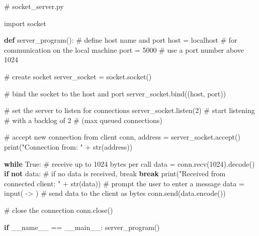 \documentclass[
  nswissgerman,
  a4paper,
  DIV=11,
  numbers=noendperiod,
  ngerman]{scrreprt}
\newenvironment{Shaded}{\begin{snugshade}}{\end{snugshade}}
\newcommand{\BuiltInTok}[1]{\textcolor[rgb]{0.00,0.23,0.31}{#1}}
\newcommand{\CommentTok}[1]{\textcolor[rgb]{0.37,0.37,0.37}{#1}}
\newcommand{\ControlFlowTok}[1]{\textcolor[rgb]{0.00,0.23,0.31}{\textbf{#1}}}
\newcommand{\DecValTok}[1]{\textcolor[rgb]{0.68,0.00,0.00}{#1}}
\newcommand{\ImportTok}[1]{\textcolor[rgb]{0.00,0.46,0.62}{#1}}
\newcommand{\KeywordTok}[1]{\textcolor[rgb]{0.00,0.23,0.31}{\textbf{#1}}}
\newcommand{\NormalTok}[1]{\textcolor[rgb]{0.00,0.23,0.31}{#1}}
\newcommand{\OperatorTok}[1]{\textcolor[rgb]{0.37,0.37,0.37}{#1}}
\newcommand{\StringTok}[1]{\textcolor[rgb]{0.13,0.47,0.30}{#1}}
\newcommand{\VariableTok}[1]{\textcolor[rgb]{0.07,0.07,0.07}{#1}}
\begin{document}
\begin{Shaded}
\begin{Highlighting}[numbers=left,,]
\CommentTok{\# socket\_server.py}

\ImportTok{import}\NormalTok{ socket}

\KeywordTok{def}\NormalTok{ server\_program():}
    \CommentTok{\# define host name and port}
\NormalTok{    host }\OperatorTok{=} \StringTok{\textquotesingle{}localhost\textquotesingle{}}    \CommentTok{\# for communication on the local machine}
\NormalTok{    port }\OperatorTok{=} \DecValTok{5000}           \CommentTok{\# use a port number above 1024}
    
    \CommentTok{\# create socket}
\NormalTok{    server\_socket }\OperatorTok{=}\NormalTok{ socket.socket()}
    
    \CommentTok{\# bind the socket to the host and port}
\NormalTok{    server\_socket.bind((host, port))}
    
    \CommentTok{\# set the server to listen for connections}
\NormalTok{    server\_socket.listen(}\DecValTok{2}\NormalTok{) }\CommentTok{\# start listening }
                            \CommentTok{\# with a backlog of 2 }
                            \CommentTok{\# (max queued connections)}
    
    \CommentTok{\# accept new connection from client}
\NormalTok{    conn, address }\OperatorTok{=}\NormalTok{ server\_socket.accept()}
    \BuiltInTok{print}\NormalTok{(}\StringTok{"Connection from: "} \OperatorTok{+} \BuiltInTok{str}\NormalTok{(address))}
    
    \ControlFlowTok{while} \VariableTok{True}\NormalTok{:}
        \CommentTok{\# receive up to 1024 bytes per call}
\NormalTok{        data }\OperatorTok{=}\NormalTok{ conn.recv(}\DecValTok{1024}\NormalTok{).decode()}
        \ControlFlowTok{if} \KeywordTok{not}\NormalTok{ data:}
            \CommentTok{\# if no data is received, break}
            \ControlFlowTok{break}
        \BuiltInTok{print}\NormalTok{(}\StringTok{"Received from connected client: "} \OperatorTok{+} \BuiltInTok{str}\NormalTok{(data))}
        \CommentTok{\# prompt the user to enter a message}
\NormalTok{        data }\OperatorTok{=} \BuiltInTok{input}\NormalTok{(}\StringTok{\textquotesingle{} {-}\textgreater{} \textquotesingle{}}\NormalTok{)}
        \CommentTok{\# send data to the client as bytes}
\NormalTok{        conn.send(data.encode())}
        
    \CommentTok{\# close the connection}
\NormalTok{    conn.close()}
    
\ControlFlowTok{if} \VariableTok{\_\_name\_\_} \OperatorTok{==} \StringTok{\textquotesingle{}\_\_main\_\_\textquotesingle{}}\NormalTok{:}
\NormalTok{    server\_program()}
\end{Highlighting}
\end{Shaded}
\end{document}
